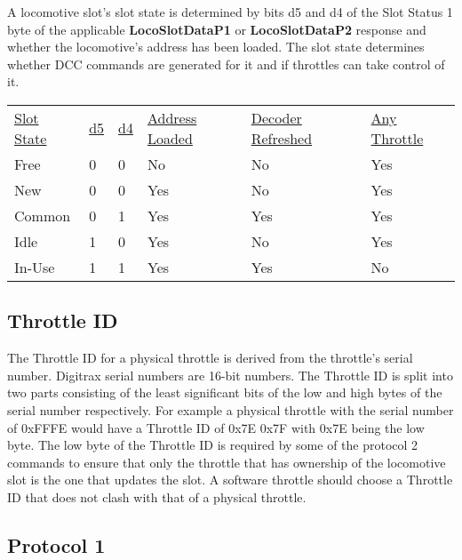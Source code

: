 A locomotive slot's \gls{slot state} is determined by bits d5 and d4 of the \gls{Slot Status 1} byte of the applicable \textbf{LocoSlotDataP1} or \textbf{LocoSlotDataP2} response and whether the locomotive's address has been loaded. The slot state determines whether DCC commands are generated for it and if throttles can take control of it.

\begin{tabular}{l l l l l l}
\underline{Slot State} & \underline{d5} & \underline{d4} & \underline{Address Loaded} & \underline{Decoder Refreshed} & \underline{Any Throttle}\\
Free & 0 & 0 & No & No & Yes\\
New & 0 & 0 & Yes & No & Yes\\
Common & 0 & 1 & Yes & Yes & Yes\\
Idle & 1 & 0 & Yes & No & Yes\\
In-Use & 1 & 1 & Yes & Yes & No\\
\end{tabular}

\subsection{Throttle ID}

The \gls{Throttle ID} for a \gls{physical throttle} is derived from the throttle's serial number. Digitrax serial numbers are 16-bit numbers. The Throttle ID is split into two parts consisting of the least significant bits of the low and high bytes of the serial number respectively. For example a physical throttle with the serial number of 0xFFFE would have a Throttle ID of 0x7E 0x7F with 0x7E being the low byte. The low byte of the Throttle ID is required by some of the protocol 2 commands to ensure that only the throttle that has ownership of the locomotive slot is the one that updates the slot. A \gls{software throttle} should choose a Throttle ID that does not clash with that of a physical throttle.

\subsection{Protocol 1}

